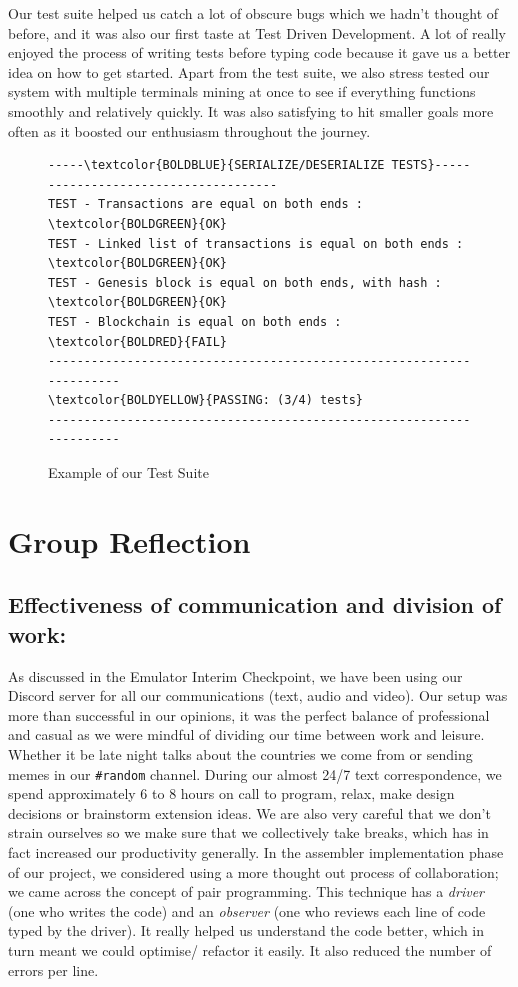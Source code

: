 \documentclass[a4paper]{article}
\begin{document}
Our test suite helped us catch a lot of obscure bugs which we hadn't thought of before, and it was also our first taste at Test Driven Development. A lot of really enjoyed the process of writing tests before typing code because it gave us a better idea on how to get started. Apart from the test suite, we also stress tested our system with multiple terminals mining at once to see if everything functions smoothly and relatively quickly. It was also satisfying to hit smaller goals more often as it boosted our enthusiasm throughout the journey.

\begin{figure}[htp]
\centering
\begin{BVerbatim}[commandchars=\\\{\}, fontsize = \small]
-----\textcolor{BOLDBLUE}{SERIALIZE/DESERIALIZE TESTS}-------------------------------------
TEST - Transactions are equal on both ends : \textcolor{BOLDGREEN}{OK}
TEST - Linked list of transactions is equal on both ends : \textcolor{BOLDGREEN}{OK}
TEST - Genesis block is equal on both ends, with hash : \textcolor{BOLDGREEN}{OK}
TEST - Blockchain is equal on both ends : \textcolor{BOLDRED}{FAIL}
---------------------------------------------------------------------
\textcolor{BOLDYELLOW}{PASSING: (3/4) tests}
---------------------------------------------------------------------
\end{BVerbatim}
\caption{Example of our Test Suite}
\label{fig:test-example}
\end{figure}

\section{Group Reflection}
\subsection{Effectiveness of communication and division of work:}

As discussed in the Emulator Interim Checkpoint, we have been using our Discord server for all our communications (text, audio and video). Our setup was more than successful in our opinions, it was the perfect balance of professional and casual as we were mindful of dividing our time between work and leisure. Whether it be late night talks about the countries we come from or sending memes in our \verb|#random| channel. During our almost 24/7 text correspondence, we spend approximately 6 to 8 hours on call to program, relax, make design decisions or brainstorm extension ideas. We are also very careful that we don't strain ourselves so we make sure that we collectively take breaks, which has in fact increased our productivity generally. In the assembler implementation phase of our project, we considered using a more thought out process of collaboration; we came across the concept of pair programming. This technique has a \textit{driver} (one who writes the code) and an \textit{observer} (one who reviews each line of code typed by the driver). It really helped us understand the code better, which in turn meant we could optimise/ refactor it easily. It also reduced the number of errors per line.
\end{document}
